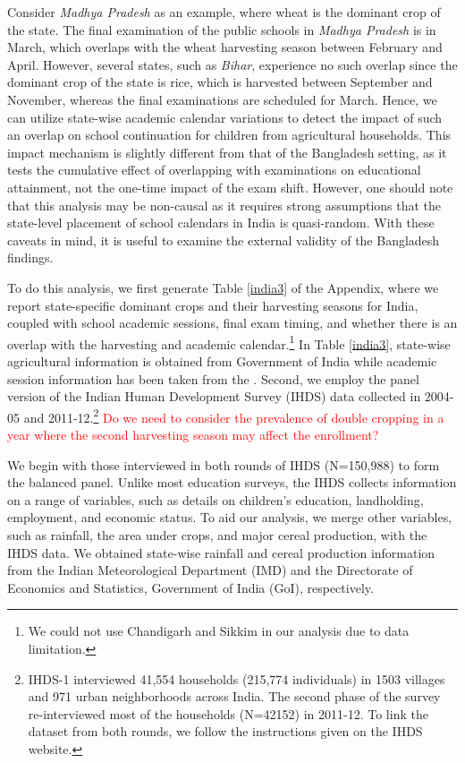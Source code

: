 \documentclass[12pt,letterpaper]{article}
\newcommand{\SAdded}[1]{\textcolor{red}{#1}}
\newcommand{\0}{\ensuremath{\mbox{\boldmath $0$}}}
\begin{document}
Consider \textit{Madhya Pradesh} as an example, where wheat is the dominant crop of the state. The final examination of the public schools in \textit{Madhya Pradesh} is in March, which overlaps with the wheat harvesting season between February and April. However, several states, such as \textit{Bihar}, experience no such overlap since the dominant crop of the state is rice, which is harvested between September and November, whereas the final examinations are scheduled for March. Hence, we can utilize state-wise academic calendar variations to detect the impact of such an overlap on school continuation for children from agricultural households. This impact mechanism is slightly different from that of the Bangladesh setting, as it tests the cumulative effect of overlapping with examinations on educational attainment, not the one-time impact of the exam shift. However, one should note that this analysis may be non-causal as it requires strong assumptions that the state-level placement of school calendars in India is quasi-random. With these caveats in mind, it is useful to examine the external validity of the Bangladesh findings. 

To do this analysis, we first generate Table \ref{india3} of the Appendix, where we report state-specific dominant crops and their harvesting seasons for India, coupled with school academic sessions, final exam timing, and whether there is an overlap with the harvesting and academic calendar.\footnote{We could not use Chandigarh and Sikkim in our analysis due to data limitation. } In Table \ref{india3}, state-wise agricultural information is obtained from Government of India \citep{doac2017agricultural} while academic session information has been taken from the \cite{doac2011education}. Second, we employ the panel version of the Indian Human Development Survey (IHDS) data collected in 2004-05 and 2011-12.\footnote{IHDS-1 interviewed 41,554 households (215,774 individuals) in 1503 villages and 971 urban neighborhoods across India. The second phase of the survey re-interviewed most of the households (N=42152) in 2011-12. To link the dataset from both rounds, we follow the instructions given on the IHDS website. } \SAdded{Do we need to consider the prevalence of double cropping in a year where the second harvesting season may affect the enrollment?}

We begin with those interviewed in both rounds of IHDS (N=150,988) to form the balanced panel. Unlike most education surveys, the IHDS collects information on a range of variables, such as details on children's education, landholding, employment, and economic status. To aid our analysis, we merge other variables, such as rainfall, the area under crops, and major cereal production, with the IHDS data. We obtained state-wise rainfall and cereal production information from the Indian Meteorological Department (IMD) and the Directorate of Economics and Statistics, Government of India (GoI), respectively.
\end{document}
